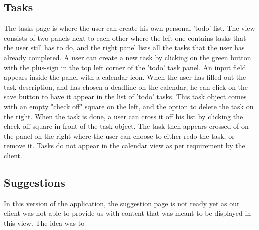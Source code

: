 \subsection{Tasks}

The tasks page is where the user can create his own personal 'todo' list. The view consists of two
panels next to each other where the left one contains tasks that the user still has to do,
and the right panel lists all the tasks that the user has already completed. A user can create
a new task by clicking on the green button with the plus-sign in the top left corner of the 'todo' task
panel. An input field appears inside the panel with a calendar icon. When the user has filled out
the task description, and has chosen a deadline on the calendar, he can click on the save button to have
it appear in the list of 'todo' tasks. This task object comes with an empty "check off" square on the left,
and the option to delete the task on the right. When the task is done, a user can cross it off his list by
clicking the check-off square in front of the task object. The task then appears crossed of on the panel on
the right where the user can choose to either redo the task, or remove it. Tasks do not appear in the calendar
view as per requirement by the client.

\subsection{Suggestions}

In this version of the application, the suggestion page is not ready yet as our client was not able to provide us with content that was meant to be
displayed in this view. The idea was to